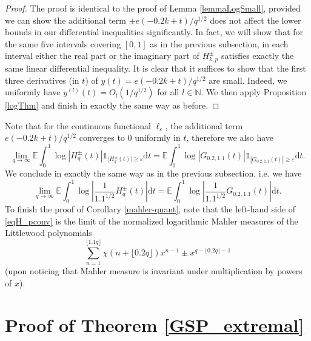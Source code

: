 \documentclass[12pt, a4paper]{amsart}
\theoremstyle{remark}
\newcommand{\ud}{\mathrm{d}}
\newcommand{\abs}[1]{\left|#1\right|}
\begin{document}
\begin{proof}
The proof is identical to the proof of Lemma \ref{lemmaLogSmall}, provided we can show the additional term $\pm e(-0.2k+t)/q^{1/2}$ does not affect the lower bounds in our differential inequalities significantly. In fact, we will show that for the same five intervals covering $[0, 1]$ as in the previous subsection, in each interval either the real part or the imaginary part of $H^{\pm}_{k, p}$ satisfies exactly the same linear differential inequality. It is clear that it suffices to show that the first three derivatives (in $t$) of $y(t) = e(-0.2k+t)/q^{1/2}$ are small. Indeed, we uniformly have $y^{(l)}(t) = O_l(1/q^{1/2})$ for all $l\in\mathbb N$. We then apply Proposition \ref{logThm} and finish in exactly the same way as before.
\end{proof}
Note that for the continuous functional $\ell_{\varepsilon}$, the additional term $e(-0.2k+t)/q^{1/2}$ converges to $0$ uniformly in $t$, therefore we also have 
$$
\lim_{q\to\infty}\mathbb E\int_{0}^{1}\log |{H}^{\pm}_{ q}(t)|\mathds 1_{\lvert{H}^{\pm}_{ q}(t)\rvert\ge \varepsilon}\ud t=\mathbb{E}\int_{0}^{1}\log |{G_{0.2, 1.1}}(t)|\mathds 1_{|{G_{0.2, 1.1}}(t)|\ge \varepsilon}\ud t.
$$ We conclude in exactly the same way as in the previous subsection, i.e. we have 
\begin{equation}\label{eqH_pconv}
    \lim_{q\to\infty}\mathbb E\int_{0}^{1}\log \abs{\frac{1}{1.1^{1/2}}{H}^{\pm}_{ q}(t)}\ud t
        = \mathbb{E}\int_{0}^{1}\log \abs{\frac{1}{1.1^{1/2}}{G_{0.2, 1.1}}(t)}\ud t.
\end{equation}
To finish the proof of Corollary \ref{mahler-quant}, note that the left-hand side of \eqref{eqH_pconv} is the limit of the normalized logarithmic Mahler measures of the Littlewood polynomials $$\sum_{n=1}^{\lfloor 1.1q\rfloor}\chi(n+\lfloor 0.2q\rfloor)x^{n-1} \pm x^{q-\lfloor0.2q\rfloor-1}$$ (upon noticing that Mahler measure is invariant under multiplication by powers of $x$). 

\section{Proof of Theorem \ref{GSP_extremal}}
\end{document}
